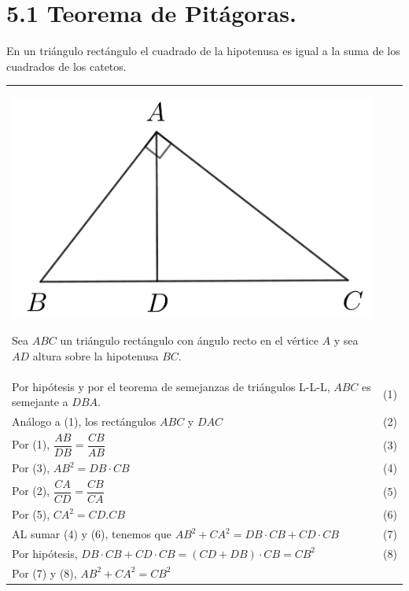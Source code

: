 \documentclass[12pt,a4paper, oneside]{book}
\begin{document}
\section{5.1 Teorema de Pitágoras.}
En un triángulo rectángulo el cuadrado de la hipotenusa es igual a la suma de los cuadrados de los catetos.
\\
\begin{tabular}{p{15.9 cm} p{1cm}}
\\
\begin{center}
\includegraphics[scale=0.8]{Imagenes/pitagoras.png} 
\end{center}
Sea $ABC$ un triángulo rectángulo con ángulo recto en el vértice $A$ y sea $AD$ altura sobre la hipotenusa $BC$.
\\Por hipótesis y por el teorema de semejanzas de triángulos L-L-L, $ABC$ es semejante a $DBA$. &(1)
\\Análogo a (1), los rectángulos $ABC$ y $DAC$ & (2)
\\Por (1), $\dfrac{AB}{DB}=\dfrac{CB}{AB}$ & (3)
\\Por (3), $AB^2=DB \cdot CB$ &(4)
\\Por (2),  $\dfrac{CA}{CD}=\dfrac{CB}{CA}$ &(5)
\\Por (5), $CA^2=CD.CB$ &(6)
\\AL sumar (4) y (6), tenemos que $AB^2+CA^2=DB\cdot CB + CD\cdot CB$ & (7)
\\Por hipótesis, $DB\cdot CB + CD\cdot CB=(CD +DB)\cdot CB=CB^2$ &(8)
\\Por (7) y (8), $AB^2 + CA^2=CB^2$
\end{tabular}
\end{document}
